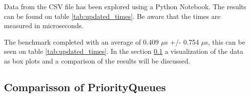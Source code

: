 \documentclass{article}
\begin{document}
Data from the CSV file has been explored using a Python Notebook. 
The results can be found on table \ref{tab:updated_times}. Be aware that the times are measured in microseconds. 

The benchmark completed with an average of 0.409 $\mu$s +/- 0.754 $\mu$s, this can be seen on table \ref{tab:updated_times}. 
In the section \ref{sec:comparisson_of_priorityqueues} a visualization of the data as 
box plots and a comparison of the results will be discussed.


\subsection{Comparisson of PriorityQueues} %
\label{sec:comparisson_of_priorityqueues}
\end{document}
